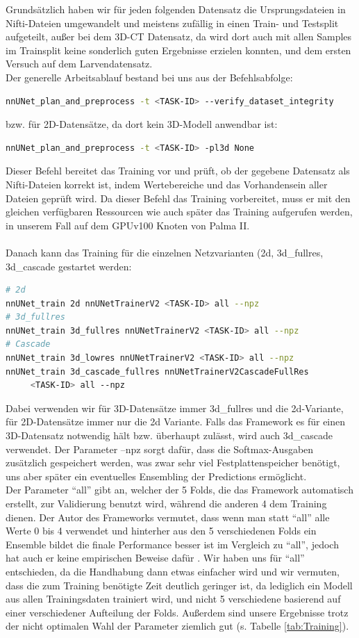 Grundsätzlich haben wir für jeden folgenden Datensatz die Ursprungsdateien in Nifti-Dateien umgewandelt und meistens zufällig in einen Train- und Testsplit aufgeteilt, außer bei dem 3D-CT Datensatz, da wird dort auch mit allen Samples im Trainsplit keine sonderlich guten Ergebnisse erzielen konnten, und dem ersten Versuch auf dem Larvendatensatz.\\
Der generelle Arbeitsablauf bestand bei uns aus der Befehlsabfolge:
\begin{lstlisting}[language=bash]
nnUNet_plan_and_preprocess -t <TASK-ID> --verify_dataset_integrity
\end{lstlisting}
bzw. für 2D-Datensätze, da dort kein 3D-Modell anwendbar ist:
\begin{lstlisting}[language=bash]
nnUNet_plan_and_preprocess -t <TASK-ID> -pl3d None
\end{lstlisting}
Dieser Befehl bereitet das Training vor und prüft, ob der gegebene Datensatz als Nifti-Dateien korrekt ist, indem Wertebereiche und das Vorhandensein aller Dateien geprüft wird. Da dieser Befehl das Training vorbereitet, muss er mit den gleichen verfügbaren Ressourcen wie auch später das Training aufgerufen werden, in unserem Fall auf dem GPUv100 Knoten von Palma II.\\\\
Danach kann das Training für die einzelnen Netzvarianten (2d, 3d\_fullres, 3d\_cascade gestartet werden:
\begin{lstlisting}[language=bash]
# 2d
nnUNet_train 2d nnUNetTrainerV2 <TASK-ID> all --npz
# 3d_fullres
nnUNet_train 3d_fullres nnUNetTrainerV2 <TASK-ID> all --npz
# Cascade
nnUNet_train 3d_lowres nnUNetTrainerV2 <TASK-ID> all --npz
nnUNet_train 3d_cascade_fullres nnUNetTrainerV2CascadeFullRes
	 <TASK-ID> all --npz
\end{lstlisting}
Dabei verwenden wir für 3D-Datensätze immer 3d\_fullres und die 2d-Variante, für 2D-Datensätze immer nur die 2d Variante. Falls das Framework es für einen 3D-Datensatz notwendig hält bzw. überhaupt zulässt, wird auch 3d\_cascade verwendet.
Der Parameter --npz sorgt dafür, dass die Softmax-Ausgaben zusätzlich gespeichert werden, was zwar sehr viel Festplattenspeicher benötigt, uns aber später ein eventuelles Ensembling der Predictions ermöglicht.\\
Der Parameter \enquote{all} gibt an, welcher der 5 Folds, die das Framework automatisch erstellt, zur Validierung benutzt wird, während die anderen 4 dem Training dienen.
Der Autor des Frameworks vermutet, dass wenn man statt \enquote{all} alle Werte 0 bis 4 verwendet und hinterher aus den 5 verschiedenen Folds ein Ensemble bildet die finale Performance besser ist im Vergleich zu \enquote{all}, jedoch hat auch er keine empirischen Beweise dafür \cite{nnunetGithub-Folds}. Wir haben uns für \enquote{all} entschieden, da die Handhabung dann etwas einfacher wird und wir vermuten, dass die zum Training benötigte Zeit deutlich geringer ist, da lediglich ein Modell aus allen Trainingsdaten trainiert wird, und nicht 5 verschiedene basierend auf einer verschiedener Aufteilung der Folds. Außerdem sind unsere Ergebnisse trotz der nicht optimalen Wahl der Parameter ziemlich gut (s. Tabelle \ref{tab:Training}). \\
